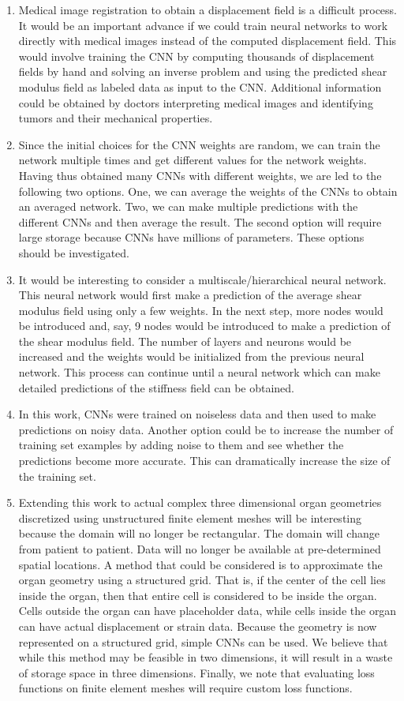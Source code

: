 \documentclass[12pt]{article}
\begin{document}
\begin{enumerate}
\item{Medical image registration to obtain a displacement field is a difficult process. It would be an important advance if we could train neural networks to work directly with medical images instead of the computed displacement field. This would involve training the CNN by computing thousands of displacement fields by hand and solving an inverse problem and using the predicted shear modulus field as labeled data as input to the CNN. Additional information could be obtained by doctors interpreting medical images and identifying tumors and their mechanical properties.}
\item{Since the initial choices for the CNN weights are random, we can train the network multiple times and get different values for the network weights. Having thus obtained many CNNs with different weights, we are led to the following two options. One, we can average the weights of the CNNs to obtain an averaged network. Two, we can make multiple predictions with the different CNNs and then average the result. The second option will require large storage because CNNs have millions of parameters. These options should be investigated.}
\item{It would be interesting to consider a multiscale/hierarchical neural network. This neural network would first make a prediction of the average shear modulus field using only a few weights. In the next step, more nodes would be introduced and, say, 9 nodes would be introduced to make a prediction of the shear modulus field. The number of layers and neurons would be increased and the weights would be initialized from the previous neural network. This process can continue until a neural network which can make detailed predictions of the stiffness field can be obtained.}
\item{In this work, CNNs were trained on noiseless data and then used to make predictions on noisy data. Another option could be to increase the number of training set examples by adding noise to them and see whether the predictions become more accurate. This can dramatically increase the size of the training set.}
\item{Extending this work to actual complex three dimensional organ geometries discretized using unstructured finite element meshes will be interesting because the domain will no longer be rectangular. The domain will change from patient to patient. Data will no longer be available at pre-determined spatial locations.  A method that could be considered is to approximate the organ geometry using a structured grid. That is, if the center of the cell lies inside the organ, then that entire cell is considered to be inside the organ. Cells outside the organ can have placeholder data, while cells inside the organ can have actual displacement or strain data. Because the geometry is now represented on a structured grid, simple CNNs can be used. We believe that while this method may be feasible in two dimensions, it will result in a waste of storage space in three dimensions. Finally, we note that evaluating loss functions on finite element meshes will require custom loss functions.}

\end{enumerate}
\end{document}
